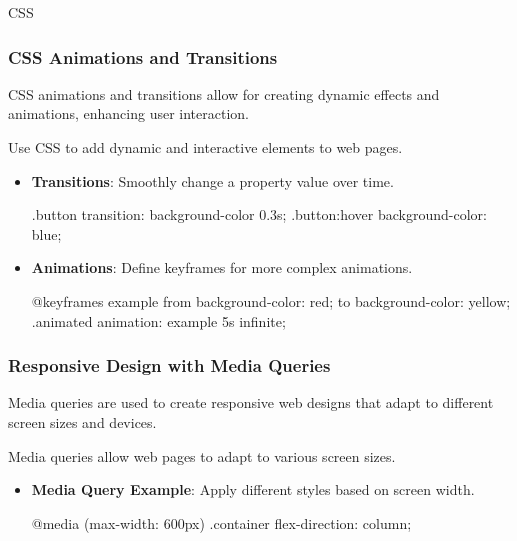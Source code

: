 \begin{notes}{CSS}
\begin{highlight}
    \end{highlight}
    
    \subsubsection*{CSS Animations and Transitions}
    
    CSS animations and transitions allow for creating dynamic effects and animations, enhancing user interaction.
    
    \begin{highlight}
    
        Use CSS to add dynamic and interactive elements to web pages.
        
        \begin{itemize}
            \item \textbf{Transitions}: Smoothly change a property value over time.
    \begin{code}[CSS]
    .button {
        transition: background-color 0.3s;
    }
    .button:hover {
        background-color: blue;
    }
    \end{code}
            \item \textbf{Animations}: Define keyframes for more complex animations.
    \begin{code}[CSS]
    @keyframes example {
        from {background-color: red;}
        to {background-color: yellow;}
    }
    .animated {
        animation: example 5s infinite;
    }
    \end{code}
        \end{itemize}
    
    \end{highlight}
    
    \subsubsection*{Responsive Design with Media Queries}
    
    Media queries are used to create responsive web designs that adapt to different screen sizes and devices.
    
    \begin{highlight}
    
        Media queries allow web pages to adapt to various screen sizes.
        
        \begin{itemize}
            \item \textbf{Media Query Example}: Apply different styles based on screen width.
    \begin{code}[CSS]
    @media (max-width: 600px) {
        .container {
            flex-direction: column;
        }
    }
    \end{code}
        \end{itemize}
    

\end{highlight}
\end{notes}
